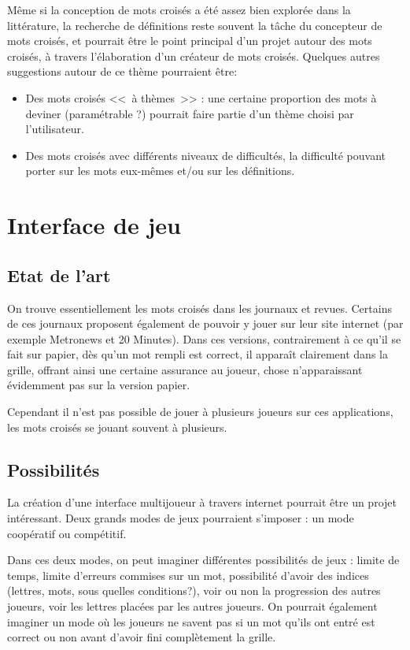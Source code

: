 \documentclass{article}
\begin{document}
Même si la conception de mots croisés a été assez bien explorée dans la littérature, la recherche de définitions reste souvent la tâche du concepteur de mots croisés, et pourrait être le point principal d'un projet autour des mots croisés, à travers l'élaboration d'un créateur de mots croisés. Quelques autres suggestions autour de ce thème pourraient être:

\begin{itemize}
	\item Des mots croisés <<~à thèmes~>> : une certaine proportion des mots à deviner (paramétrable ?) pourrait faire partie d'un thème choisi par l'utilisateur.
	\item Des mots croisés avec différents niveaux de difficultés, la difficulté pouvant porter sur les mots eux-mêmes et/ou sur les définitions.
\end{itemize}

\section{Interface de jeu}

\subsection{Etat de l'art}

On trouve essentiellement les mots croisés dans les journaux et revues. Certains de ces journaux proposent également de pouvoir y jouer sur leur site internet (par exemple Metronews et 20 Minutes). Dans ces versions, contrairement à ce qu'il se fait sur papier, dès qu'un mot rempli est correct, il apparaît clairement dans la grille, offrant ainsi une certaine assurance au joueur, chose n'apparaissant évidemment pas sur la version papier.

Cependant il n'est pas possible de jouer à plusieurs joueurs sur ces applications, les mots croisés se jouant souvent à plusieurs.

\subsection{Possibilités}

La création d'une interface multijoueur à travers internet pourrait être un projet intéressant. Deux grands modes de jeux pourraient s'imposer : un mode coopératif ou compétitif.

Dans ces deux modes, on peut imaginer différentes possibilités de jeux : limite de temps, limite d'erreurs commises sur un mot, possibilité d'avoir des indices (lettres, mots, sous quelles conditions?), voir ou non la progression des autres joueurs, voir les lettres placées par les autres joueurs. On pourrait également imaginer un mode où les joueurs ne savent pas si un mot qu'ils ont entré est correct ou non avant d'avoir fini complètement la grille.
\end{document}
